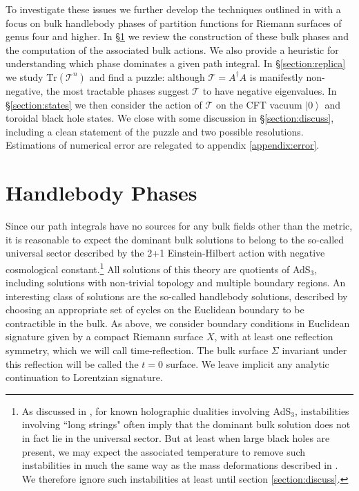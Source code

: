 \documentclass[letterpaper,12pt]{article}
\newcommand{\Tr}{\text{Tr}}
\newcommand{\ket}[1]{\left| #1\right>}
\begin{document}
To investigate these issues we further develop the techniques outlined in \cite{Krasnov1, Krasnov2, MRW} with a focus on bulk handlebody phases of partition functions for Riemann surfaces of genus four and higher. In \S\ref{section:handlebody} we review the construction of these bulk phases and the computation of the associated bulk actions. We also provide a heuristic for understanding which phase dominates a given path integral. In \S \ref{section:replica} we study $\Tr(\mathcal T^n)$ and find a puzzle:  although $\mathcal T = A^\dagger A$ is manifestly non-negative, the most tractable phases suggest $\mathcal T$ to have negative eigenvalues.   In \S \ref{section:states} we then consider the action of $\mathcal T$ on the CFT vacuum $\ket 0$ and toroidal black hole states.  We close with some discussion in \S\ref{section:discuss}, including
a clean statement of the puzzle and two possible resolutions. Estimations of numerical error are relegated to appendix \ref{appendix:error}.


\section{Handlebody Phases}
\label{section:handlebody}

Since our path integrals have no sources for any bulk fields other than the metric, it is reasonable to expect the dominant bulk solutions to belong to the so-called universal sector described by the 2+1 Einstein-Hilbert action with negative cosmological constant.\footnote{As discussed in \cite{Seiberg:1999xz}, for known holographic dualities involving AdS$_3$, instabilities involving ``long strings" often imply that the dominant bulk solution does not in fact lie in the universal sector.  But at least when large black holes are present, we may expect the associated temperature to remove such instabilities in much the same way as the mass deformations described in \cite{MaldMaoz}.  We therefore ignore such instabilities at least until section \ref{section:discuss}.} All solutions of this theory are quotients of AdS$_3$, including solutions with non-trivial topology and multiple boundary regions. An interesting class of solutions are the so-called handlebody solutions, described by choosing an appropriate set of cycles on the Euclidean boundary to be contractible in the bulk. As above, we consider boundary conditions in Euclidean signature given by a compact Riemann surface $X$, with at least one reflection symmetry, which we will call time-reflection. The bulk surface $\Sigma$ invariant under this reflection will be called the $t=0$ surface. We leave implicit any analytic continuation to Lorentzian signature.
\end{document}
